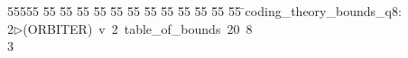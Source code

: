 %
%
\begin{tabbing}
55555 \= 55 \= 55 \= 55 \= 55 \= 55 \= 55 \= 55 \= 55 \= 55 \= 55 \= 55 \= 55 \= \>coding\_theory\_bounds\_q8:\\[0pt]
2\>$\triangleright$\>(ORBITER)\ v\ 2\ table\_of\_bounds\ 20\ 8\\[0pt]
3\>\end{tabbing}

